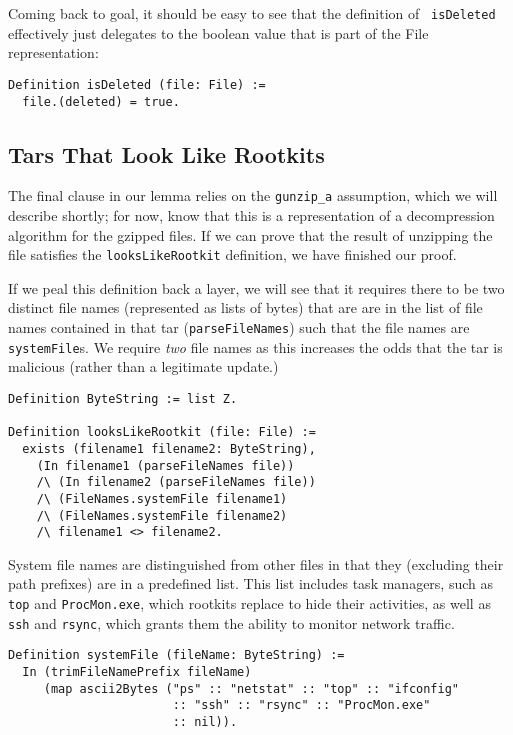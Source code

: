 \documentclass[nocopyrightspace]{sigplanconf}
\begin{document}
Coming back to goal, it should be easy to see that the definition of {\tt
isDeleted} effectively just delegates to the boolean value that is part of the
File representation:

\begin{lstlisting}
Definition isDeleted (file: File) :=
  file.(deleted) = true.
\end{lstlisting}

\subsection{Tars That Look Like Rootkits}
The final clause in our lemma relies on the {\tt gunzip\_a} assumption, which
we will describe shortly; for now, know that this is a representation of a
decompression algorithm for the gzipped files. If we can prove that the result
of unzipping the file satisfies the {\tt looksLikeRootkit} definition, we have
finished our proof.

If we peal this definition back a layer, we will see that it requires there to
be two distinct file names (represented as lists of bytes) that are are in the
list of file names contained in that tar ({\tt parseFileNames}) such that the
file names are {\tt systemFile}s. We require {\em two} file names as this
increases the odds that the tar is malicious (rather than a legitimate
update.)

\begin{lstlisting}
Definition ByteString := list Z.

Definition looksLikeRootkit (file: File) :=
  exists (filename1 filename2: ByteString),
    (In filename1 (parseFileNames file))
    /\ (In filename2 (parseFileNames file))
    /\ (FileNames.systemFile filename1)
    /\ (FileNames.systemFile filename2)
    /\ filename1 <> filename2.
\end{lstlisting}

System file names are distinguished from other files in that they (excluding
their path prefixes) are in a predefined list. This list includes task
managers, such as {\tt top} and {\tt ProcMon.exe}, which rootkits replace to
hide their activities, as well as {\tt ssh} and {\tt rsync}, which grants them
the ability to monitor network traffic.

\begin{lstlisting}
Definition systemFile (fileName: ByteString) :=
  In (trimFileNamePrefix fileName)
     (map ascii2Bytes ("ps" :: "netstat" :: "top" :: "ifconfig" 
                       :: "ssh" :: "rsync" :: "ProcMon.exe"
                       :: nil)).
\end{lstlisting}
\end{document}
